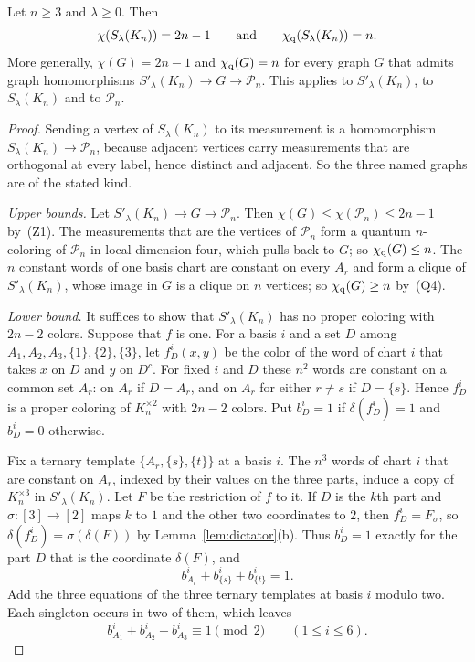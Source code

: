 \begin{theorem}\label{thm:complete}
Let $n\ge3$ and $\lambda\ge0$. Then
\[
 \chi(S_\lambda(K_n))=2n-1\qquad\text{and}\qquad\chi_{\mathrm q}(S_\lambda(K_n))=n .
\]
More generally, $\chi(G)=2n-1$ and $\chi_{\mathrm q}(G)=n$ for every graph $G$ that admits graph homomorphisms $S'_\lambda(K_n)\to G\to\mathcal P_n$. This applies to $S'_\lambda(K_n)$, to $S_\lambda(K_n)$ and to $\mathcal P_n$.
\end{theorem}
\begin{proof}
Sending a vertex of $S_\lambda(K_n)$ to its measurement is a homomorphism $S_\lambda(K_n)\to\mathcal P_n$, because adjacent vertices carry measurements that are orthogonal at every label, hence distinct and adjacent. So the three named graphs are of the stated kind.

\emph{Upper bounds.} Let $S'_\lambda(K_n)\to G\to\mathcal P_n$. Then $\chi(G)\le\chi(\mathcal P_n)\le2n-1$ by~(Z1). The measurements that are the vertices of $\mathcal P_n$ form a quantum $n$-coloring of $\mathcal P_n$ in local dimension four, which pulls back to $G$; so $\chi_{\mathrm q}(G)\le n$. The $n$ constant words of one basis chart are constant on every $A_r$ and form a clique of $S'_\lambda(K_n)$, whose image in $G$ is a clique on $n$ vertices; so $\chi_{\mathrm q}(G)\ge n$ by~(Q4).

\emph{Lower bound.} It suffices to show that $S'_\lambda(K_n)$ has no proper coloring with $2n-2$ colors. Suppose that $f$ is one. For a basis $i$ and a set $D$ among $A_1,A_2,A_3,\{1\},\{2\},\{3\}$, let $f^i_D(x,y)$ be the color of the word of chart $i$ that takes $x$ on $D$ and $y$ on $D^c$. For fixed $i$ and $D$ these $n^2$ words are constant on a common set $A_r$: on $A_r$ if $D=A_r$, and on $A_r$ for either $r\ne s$ if $D=\{s\}$. Hence $f^i_D$ is a proper coloring of $K_n^{\times2}$ with $2n-2$ colors. Put $b^i_D=1$ if $\delta(f^i_D)=1$ and $b^i_D=0$ otherwise.

Fix a ternary template $\{A_r,\{s\},\{t\}\}$ at a basis $i$. The $n^3$ words of chart $i$ that are constant on $A_r$, indexed by their values on the three parts, induce a copy of $K_n^{\times3}$ in $S'_\lambda(K_n)$. Let $F$ be the restriction of $f$ to it. If $D$ is the $k$th part and $\sigma:[3]\to[2]$ maps $k$ to $1$ and the other two coordinates to $2$, then $f^i_D=F_\sigma$, so $\delta(f^i_D)=\sigma(\delta(F))$ by Lemma~\ref{lem:dictator}(b). Thus $b^i_D=1$ exactly for the part $D$ that is the coordinate $\delta(F)$, and
\[
 b^i_{A_r}+b^i_{\{s\}}+b^i_{\{t\}}=1 .
\]
Add the three equations of the three ternary templates at basis $i$ modulo two. Each singleton occurs in two of them, which leaves
\begin{equation}\label{eq:odd-bits}
 b^i_{A_1}+b^i_{A_2}+b^i_{A_3}\equiv1\pmod2\qquad(1\le i\le6).
\end{equation}


\end{proof}
